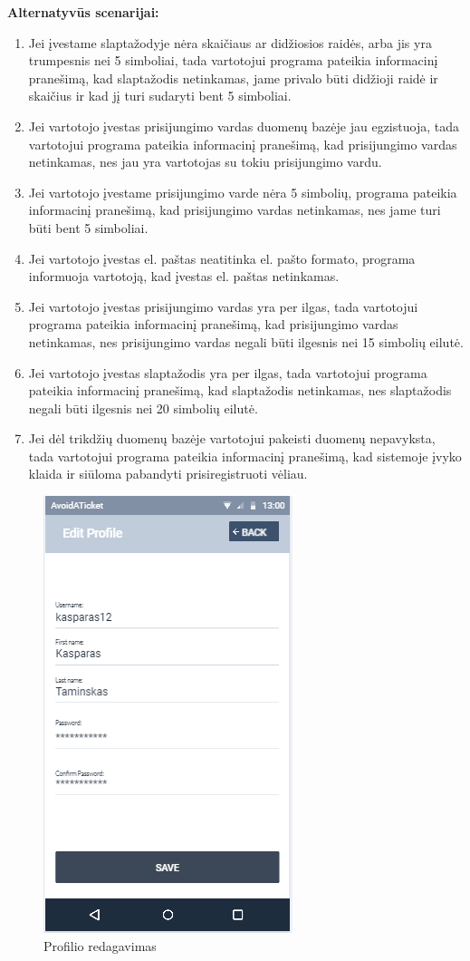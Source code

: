 \documentclass{VUMIFPSkursinis}
\begin{document}
	\textbf{Alternatyvūs scenarijai:}
	\begin{enumerate}[itemsep=-2mm]
		\item Jei įvestame slaptažodyje nėra skaičiaus ar didžiosios raidės, arba jis yra trumpesnis nei 5 simboliai, tada vartotojui programa pateikia informacinį pranešimą, kad slaptažodis netinkamas, jame privalo būti didžioji raidė ir skaičius ir kad jį turi sudaryti bent 5 simboliai.
		\item Jei vartotojo įvestas prisijungimo vardas duomenų bazėje jau egzistuoja, tada vartotojui programa pateikia informacinį pranešimą, kad prisijungimo vardas netinkamas, nes jau yra vartotojas su tokiu prisijungimo vardu.
		\item Jei vartotojo įvestame prisijungimo varde nėra 5 simbolių, programa pateikia informacinį pranešimą, kad prisijungimo vardas netinkamas, nes jame turi būti bent 5 simboliai.
		\item Jei vartotojo įvestas el. paštas neatitinka el. pašto formato, programa informuoja vartotoją, kad įvestas el. paštas netinkamas.
		\item Jei vartotojo įvestas prisijungimo vardas yra per ilgas, tada vartotojui programa pateikia informacinį pranešimą, kad prisijungimo vardas netinkamas, nes prisijungimo vardas negali būti ilgesnis nei 15 simbolių eilutė.
		\item Jei  vartotojo įvestas slaptažodis yra per ilgas, tada vartotojui programa pateikia informacinį pranešimą, kad slaptažodis netinkamas, nes slaptažodis negali būti ilgesnis nei 20 simbolių eilutė.
		\item Jei dėl trikdžių duomenų bazėje vartotojui pakeisti duomenų nepavyksta, tada vartotojui programa pateikia informacinį pranešimą, kad sistemoje įvyko klaida ir siūloma pabandyti prisiregistruoti vėliau.
	\end{enumerate} 
	\begin{figure}[H]
				\centering
				\includegraphics[scale=0.55]{img/mockup_profileedit}
				\caption{Profilio redagavimas}
				\label{img:profilio redagavimas}
			\end{figure}
\end{document}
